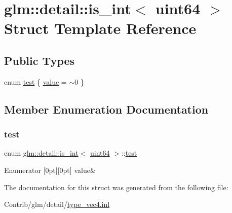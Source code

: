 \hypertarget{structglm_1_1detail_1_1is__int_3_01uint64_01_4}{}\section{glm\+:\+:detail\+:\+:is\+\_\+int$<$ uint64 $>$ Struct Template Reference}
\label{structglm_1_1detail_1_1is__int_3_01uint64_01_4}
\subsection*{Public Types}
\begin{DoxyCompactItemize}
\item 
enum \mbox{\hyperlink{structglm_1_1detail_1_1is__int_3_01uint64_01_4_a8be9e204582a6cf6049dac4a685cb868}{test}} \{ \mbox{\hyperlink{structglm_1_1detail_1_1is__int_3_01uint64_01_4_a8be9e204582a6cf6049dac4a685cb868a78866d286f2c5661c099f47ae16450cc}{value}} = $\sim$0
 \}
\end{DoxyCompactItemize}


\subsection{Member Enumeration Documentation}
\mbox{\label{structglm_1_1detail_1_1is__int_3_01uint64_01_4_a8be9e204582a6cf6049dac4a685cb868}} 
\subsubsection{\texorpdfstring{test}{test}}
{\footnotesize\ttfamily enum \mbox{\hyperlink{structglm_1_1detail_1_1is__int}{glm\+::detail\+::is\+\_\+int}}$<$ \mbox{\hyperlink{namespaceglm_1_1detail_adec4b19bf4982125e122db2fe03c5810}{uint64}} $>$\+::\mbox{\hyperlink{structglm_1_1detail_1_1is__int_3_01uint64_01_4_a8be9e204582a6cf6049dac4a685cb868}{test}}}

\begin{DoxyEnumFields}{Enumerator}
[0pt][0pt]{}\mbox{\label{structglm_1_1detail_1_1is__int_3_01uint64_01_4_a8be9e204582a6cf6049dac4a685cb868a78866d286f2c5661c099f47ae16450cc}} 
value&\\
\hline

\end{DoxyEnumFields}


The documentation for this struct was generated from the following file\+:\begin{DoxyCompactItemize}
\item 
Contrib/glm/detail/\mbox{\hyperlink{type__vec4_8inl}{type\+\_\+vec4.\+inl}}\end{DoxyCompactItemize}
